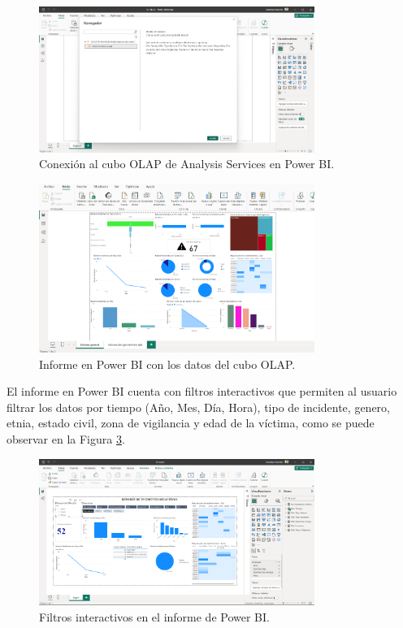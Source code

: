 \begin{figure}[H]
    \centering
    \includegraphics[width=0.8\textwidth]{chapters/III-resultados-y-discusion/resources/images/conexion-bi.png}
    \caption{Conexión al cubo OLAP de Analysis Services en Power BI.}
    \label{fig:conexion-bi}
\end{figure}

\begin{figure}[H]
    \centering
    \includegraphics[width=0.8\textwidth]{chapters/III-resultados-y-discusion/resources/images/informe-bi.png}
    \caption{Informe en Power BI con los datos del cubo OLAP.}
    \label{fig:informe-bi}
\end{figure}

El informe en Power BI cuenta con filtros interactivos que permiten al usuario filtrar los datos por tiempo (Año, Mes, Día, Hora), tipo de
incidente, genero, etnia, estado civil, zona de vigilancia y edad de la víctima, como se puede observar en la Figura \ref{fig:filtros-bi}.

\begin{figure}[H]
    \centering
    \includegraphics[width=0.8\textwidth]{chapters/III-resultados-y-discusion/resources/images/filtros-bi.png}
    \caption{Filtros interactivos en el informe de Power BI.}
    \label{fig:filtros-bi}
\end{figure}
